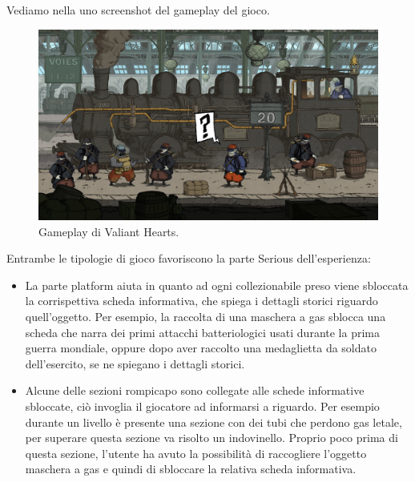 Vediamo nella \myfig{\ref{fig:vhgameplay}} uno screenshot del gameplay del gioco. 

\begin{figure}[h]
\centerline{\includegraphics[scale=0.17]{images/statoarte/vhgameplay.jpg}}
\caption{Gameplay di Valiant Hearts.}
\label{fig:vhgameplay}
\end{figure}

Entrambe le tipologie di gioco favoriscono la parte Serious dell'esperienza:

\begin{itemize}
\item La parte platform aiuta in quanto ad ogni collezionabile preso viene sbloccata la corrispettiva scheda informativa, che spiega i dettagli storici riguardo quell'oggetto. Per esempio, la raccolta di una maschera a gas sblocca una scheda che narra dei primi attacchi batteriologici usati durante la prima guerra mondiale, oppure dopo aver raccolto una medaglietta da soldato dell'esercito, se ne spiegano i dettagli storici.
\item Alcune delle sezioni rompicapo sono collegate alle schede informative sbloccate, ciò invoglia il giocatore ad informarsi a riguardo. Per esempio durante un livello è presente una sezione con dei tubi che perdono gas letale, per superare questa sezione va risolto un indovinello. Proprio poco prima di questa sezione, l'utente ha avuto la possibilità di raccogliere l'oggetto maschera a gas e quindi di sbloccare la relativa scheda informativa.
\end{itemize}

